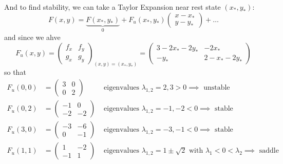 \documentclass[12pt]{report}
\begin{document}
And to find stability, we can take a Taylor Expansion near rest state $(x_*, y_*)$:
\[F(x, y) = \underbrace{F(x_*, y_*)}_{0} + F_u(x_*, y_*) \begin{pmatrix}
        x - x_* \\ y - y_*
    \end{pmatrix} + \dots\]
and since we ahve
\[F_u(x, y) = \begin{pmatrix}
        f_x & f_y \\
        g_x & g_y
    \end{pmatrix}_{(x, y) = (x_*, y_*)} = \begin{pmatrix}
        3 - 2x_* - 2y_* & -2x_*          \\
        -y_*            & 2 - x_* - 2y_*
    \end{pmatrix}\]
so that
\begin{align*}
    F_u(0, 0) & = \begin{pmatrix}
                      3 & 0 \\
                      0 & 2
                  \end{pmatrix} & \text{ eigenvalues } \lambda_{1, 2} = 2, 3 > 0 \implies \text{ unstable}                                             \\
    F_u(0, 2) & = \begin{pmatrix}
                      -1 & 0  \\
                      -2 & -2
                  \end{pmatrix} & \text{ eigenvalues } \lambda_{1, 2} = -1, -2 < 0 \implies \text{ stable}                                             \\
    F_u(3, 0) & = \begin{pmatrix}
                      -3 & -6 \\
                      0  & -1
                  \end{pmatrix} & \text{ eigenvalues } \lambda_{1, 2} = -3, -1 < 0 \implies \text{ stable}                                             \\
    F_u(1, 1) & = \begin{pmatrix}
                      1  & -2 \\
                      -1 & 1
                  \end{pmatrix} & \text{ eigenvalues } \lambda_{1, 2} = 1 \pm \sqrt{2} \text{ with } \lambda_1 < 0 < \lambda_2 \implies \text{ saddle}
\end{align*}
\end{document}
